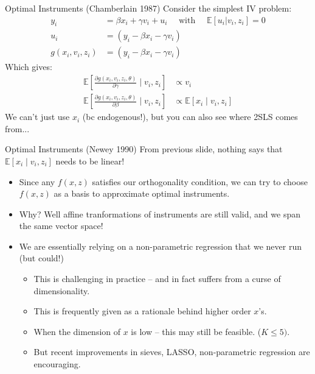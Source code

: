 \documentclass[aspectratio=169,10pt]{beamer}
\begin{document}
\begin{frame}{Optimal Instruments (Chamberlain 1987)}
Consider the simplest IV problem:
\begin{align*}
y_i &= \beta x_i + \gamma v_i + u_i \quad \text{ with } \quad \mathbb{E}[u_i | v_i, z_i] =0 \\
u_i &= \left(y_i - \beta x_i - \gamma v_i \right) \\
g(x_i,v_i,z_i) &= \left(y_i - \beta x_i - \gamma v_i \right)
 \end{align*}
 Which gives:
\begin{align*}
\mathbb{E}\left[\frac{\partial g(x_i,v_i, z_i,\theta)}{\partial \gamma} \mid v_i, z_i \right] &\propto v_i\\
\mathbb{E}\left[\frac{\partial g(x_i,v_i, z_i,\theta)}{\partial \beta} \mid v_i, z_i \right] &
\propto \mathbb{E}\left[x_i \mid v_i, z_i \right]
\end{align*}
We can't just use $x_i$ (bc endogenous!), but you can also see where 2SLS comes from...
\end{frame}




\begin{frame}{Optimal Instruments (Newey 1990)}
From previous slide, nothing says that $\mathbb{E}\left[x_i \mid v_i, z_i \right]$ needs to be \alert{linear}!
\begin{itemize}
\item Since any $f(x,z)$ satisfies our orthogonality condition, we can try to choose $f(x,z)$ as a \alert{basis} to approximate optimal instruments.
\item Why? Well affine tranformations of instruments are still valid, and we span the same vector space!
\item We are essentially relying on a non-parametric regression that we never run (but could!)
\begin{itemize}
\item This is challenging in practice -- and in fact suffers from a curse of dimensionality.
\item This is frequently given as a rationale behind higher order $x$'s.
\item When the dimension of $x$ is low -- this may still be feasible. ($K \leq 5)$.
\item But recent improvements in sieves, LASSO, non-parametric regression are encouraging.
\end{itemize}
\end{itemize}
\end{frame}
\end{document}
